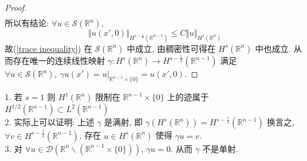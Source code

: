 \documentclass[11pt]{ctexart}[UTF8]
\begin{document}
\begin{proof}
\begin{equation*}
\begin{aligned}
        \end{aligned}
    \end{equation*}
    所以有结论: $\forall u \in \mathscr{S}(\mathbb{R}^n)$,
    \begin{equation*}
        \Vert u(x', 0) \Vert_{H^{s-\frac{1}{2}}(\mathbb{R}^{n-1})} \leq C\Vert u \Vert_{H^{s}(\mathbb{R}^n)}
    \end{equation*}
    故(\ref{trace inequality}) 在 $\mathscr{S}(\mathbb{R}^n)$ 中成立, 由稠密性可得在 $H^s(\mathbb{R}^n)$ 中也成立. 从而存在唯一的连续线性映射 $\gamma: H^{s}(\mathbb{R}^n) \longrightarrow H^{s-\frac{1}{2}}(\mathbb{R}^{n-1})$ 满足 $\forall u \in \mathscr{S}(\mathbb{R}^n),\ \gamma u(x') = u|_{\mathbb{R}^{n-1}\times \{0\}} = u(x', 0)$.
\end{proof}
\begin{remark}
    1. 若 $s=1$ 则 $H^{1}(\mathbb{R}^n)$ 限制在 $\mathbb{R}^{n-1}\times \{0\}$ 上的迹属于 $H^{1/2}(\mathbb{R}^{n-1})\subset L^2(\mathbb{R}^{n-1})$\\
    2. 实际上可以证明: 上述 $\gamma$ 是满射, 即 $\gamma(H^s(\mathbb{R}^n)) = H^{s-\frac{1}{2}}(\mathbb{R}^{n-1})$ 换言之, $\forall v \in H^{s-\frac{1}{2}}(\mathbb{R}^{n-1})$, 存在 $u \in H^s(\mathbb{R}^n)$ 使得 $\gamma u = v$.\\
    3. 对 $\forall u \in \mathscr{D}(\mathbb{R}^n \backslash (\mathbb{R}^{n-1}\times \{0\}))$, $\gamma u = 0$. 从而 $\gamma$ 不是单射.
\end{remark}
\end{document}
